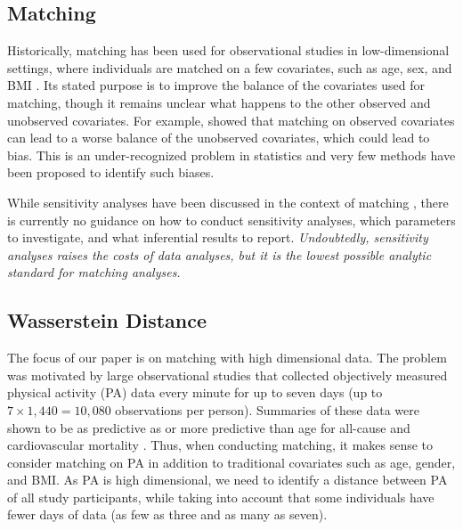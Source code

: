 \subsection{Matching}\label{sec:matching}

Historically, matching has been used for observational studies in low-dimensional settings, where individuals are matched on a few covariates, such as age, sex, and BMI \cite{stuart_matching_2010}. Its stated purpose is to improve the balance of the covariates used for matching, though it remains unclear what happens to the other observed and unobserved covariates. For example, \cite{king_why_2019} showed that matching on observed covariates can lead to a worse balance of the unobserved covariates, which could lead to bias. This is an under-recognized problem in statistics and very few methods have been proposed to identify such biases. 


While sensitivity analyses have been discussed in the context of matching \cite{ rosenbaum_sensitivity_1991,rosenbaum_sensitivity_2014,rudolph_using_2018,stuart_matching_2010}, there is currently no guidance on how to conduct sensitivity analyses, which parameters to investigate, and what inferential results to report. {\it Undoubtedly, sensitivity analyses raises the costs of data analyses, but it is the lowest possible analytic standard for matching analyses.}


\subsection{Wasserstein Distance}\label{sec:distance}

The focus of our paper is on matching with high dimensional data. The problem was motivated by large observational studies that collected objectively measured physical activity (PA) data every minute for up to seven days (up to $7\times 1{,}440=10{,}080$ observations per person). Summaries of these data were shown to be as predictive as or more predictive than age for all-cause and cardiovascular mortality \cite{ledbetter2022,leroux_quantifying_2020,smirnova_predictive_2020}. Thus, when conducting matching, it makes sense to consider matching on PA in addition to traditional covariates such as age, gender, and BMI. As PA is high dimensional, we need to identify a distance between PA of all study participants, while taking into account that some individuals have fewer days of data (as few as three and as many as seven). 


